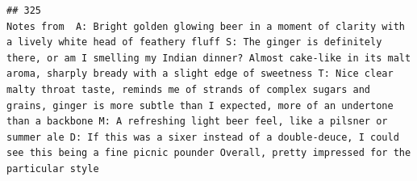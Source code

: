 \documentclass[
  a4paper,
]{article}
\begin{document}
\begin{verbatim}
## 325                                                                                                                                                                                                                                                                                                                                                                                                                                                                                                                                                                                                                                                                                                                                                                                                                                                                                                                                                                                                                                                                                                                                                                                                                                                                                                                                                                                                                                                                                                         Notes from  A: Bright golden glowing beer in a moment of clarity with a lively white head of feathery fluff S: The ginger is definitely there, or am I smelling my Indian dinner? Almost cake-like in its malt aroma, sharply bready with a slight edge of sweetness T: Nice clear malty throat taste, reminds me of strands of complex sugars and grains, ginger is more subtle than I expected, more of an undertone than a backbone M: A refreshing light beer feel, like a pilsner or summer ale D: If this was a sixer instead of a double-deuce, I could see this being a fine picnic pounder Overall, pretty impressed for the particular style

\end{verbatim}
\end{document}
